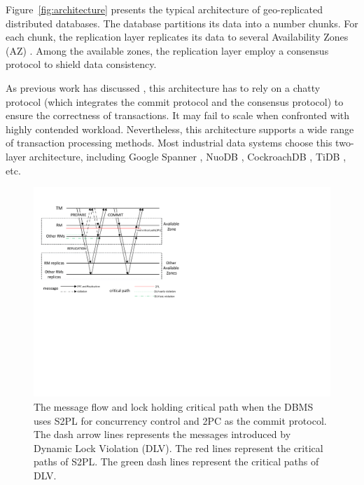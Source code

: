 \documentclass[conference]{IEEEtran}
\begin{document}
Figure~\ref{fig:architecture} presents the typical architecture of geo-replicated distributed databases.
The database partitions its data into a number chunks.
For each chunk, the replication layer replicates its data to several Availability Zones (AZ) \cite{Aurora:conf/sigmod/VerbitskiGSCGBM18}.
Among the available zones, the replication layer employ a consensus protocol to shield data consistency.

As previous work has discussed \cite{Calvin:conf/sigmod/ThomsonDWRSA12}\cite{Tapir:conf/sosp/ZhangSSKP15}\cite{Janus:conf/osdi/MuNLL16},
this architecture has to rely on a chatty protocol (which integrates the commit protocol and the consensus protocol) to ensure the correctness of transactions.
It may fail to scale when confronted with highly contended workload.
Nevertheless, this architecture supports a wide range of transaction processing methods.
Most industrial data systems choose this two-layer architecture, including Google Spanner \cite{Spanner:conf/osdi/CorbettDEFFFGGHHHKKLLMMNQRRSSTWW12}\cite{Spanner:conf/sigmod/BaconBBCDFFGJKL17},
NuoDB \cite{NuoDB}, CockroachDB \cite{CockroachDB}, TiDB \cite{TiDB}, etc.

\begin{figure}[htbp]
  \centerline{\includegraphics[scale=0.62]{figure/message_flow.pdf}}
  \caption{The message flow and lock holding critical path when the DBMS uses S2PL for concurrency control and 2PC as the commit protocol.
The dash arrow lines represents the messages introduced by Dynamic Lock Violation (DLV). The red lines represent the critical paths of S2PL.
The green dash lines represent the critical paths of DLV.}
  \label{fig:two_layers_architecture}
\end{figure}
\end{document}
